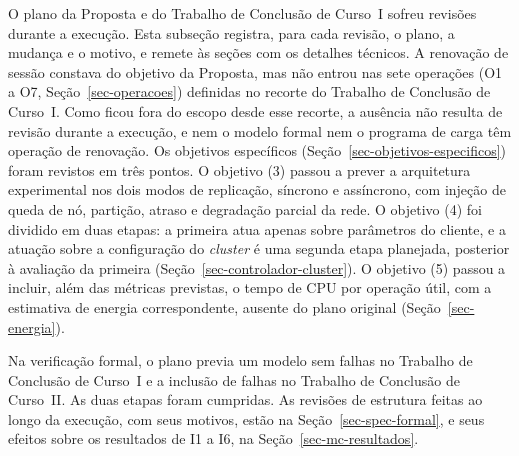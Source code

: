 O plano da Proposta e do Trabalho de Conclusão de Curso~I sofreu revisões durante a execução. Esta subseção registra, para cada revisão, o plano, a mudança e o motivo, e remete às seções com os detalhes técnicos. A renovação de sessão constava do objetivo da Proposta, mas não entrou nas sete operações (O1 a O7, Seção~\ref{sec-operacoes}) definidas no recorte do Trabalho de Conclusão de Curso~I. Como ficou fora do escopo desde esse recorte, a ausência não resulta de revisão durante a execução, e nem o modelo formal nem o programa de carga têm operação de renovação. Os objetivos específicos (Seção~\ref{sec-objetivos-especificos}) foram revistos em três pontos. O objetivo (3) passou a prever a arquitetura experimental nos dois modos de replicação, síncrono e assíncrono, com injeção de queda de nó, partição, atraso e degradação parcial da rede. O objetivo (4) foi dividido em duas etapas: a primeira atua apenas sobre parâmetros do cliente, e a atuação sobre a configuração do \emph{cluster} é uma segunda etapa planejada, posterior à avaliação da primeira (Seção~\ref{sec-controlador-cluster}). O objetivo (5) passou a incluir, além das métricas previstas, o tempo de CPU por operação útil, com a estimativa de energia correspondente, ausente do plano original (Seção~\ref{sec-energia}).

Na verificação formal, o plano previa um modelo sem falhas no Trabalho de Conclusão de Curso~I e a inclusão de falhas no Trabalho de Conclusão de Curso~II. As duas etapas foram cumpridas. As revisões de estrutura feitas ao longo da execução, com seus motivos, estão na Seção~\ref{sec-spec-formal}, e seus efeitos sobre os resultados de I1 a I6, na Seção~\ref{sec-mc-resultados}.

